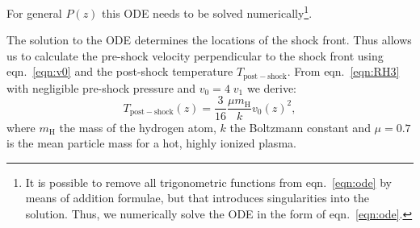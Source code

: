 For general $P(z)$ this ODE needs to be solved numerically\footnote{It is possible to remove all trigonometric functions from eqn.~\ref{eqn:ode} by means of addition formulae, but that introduces singularities into the solution. Thus, we numerically solve the ODE in the form of eqn.~\ref{eqn:ode}.}. 

The solution to the ODE determines the locations of the shock front. Thus allows us to calculate the pre-shock velocity perpendicular to the shock front using eqn.~\ref{eqn:v0} and the post-shock temperature $T_{\mathrm{post-shock}}$. From eqn.~\ref{eqn:RH3} with negligible pre-shock pressure and $v_0=4\;v_1$ we derive:
\begin{equation}
T_{\mathrm{post-shock}}(z) = \frac{3}{16} \frac{\mu m_{\textrm{H}}}{k} v_0(z)^2,\label{eqn:T}
\end{equation}
where $m_{\textrm{H}}$ the mass of the hydrogen atom, $k$ the Boltzmann constant and $\mu=0.7$ is the mean particle mass for a hot, highly ionized plasma.